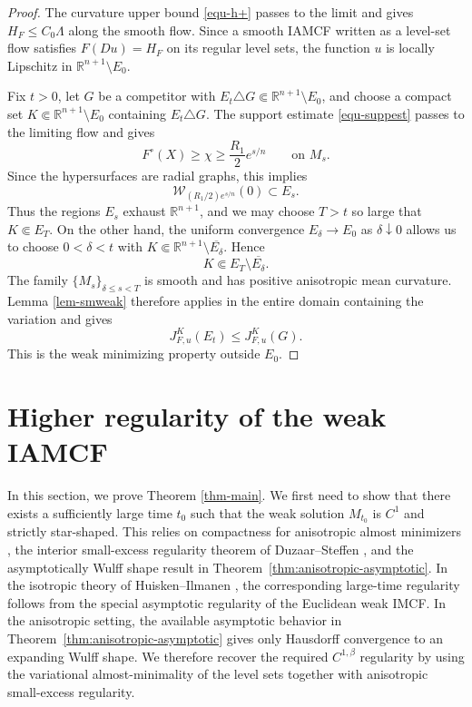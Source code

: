 \documentclass[10pt,a4paper]{amsart}
\numberwithin{equation}{section}
\begin{document}
\begin{proof}
	The curvature upper bound \eqref{equ-h+} passes to the limit and gives $H_F\leq C_0\Lambda$ along the smooth flow. Since a smooth IAMCF written as a level-set flow satisfies $F(Du)=H_F$ on its regular level sets, the function $u$ is locally Lipschitz in $\mathbb{R}^{n+1}\setminus E_0$.

	Fix $t>0$, let $G$ be a competitor with $E_t\triangle G\Subset\mathbb{R}^{n+1}\setminus E_0$, and choose a compact set $K\Subset\mathbb{R}^{n+1}\setminus E_0$ containing $E_t\triangle G$. The support estimate \eqref{equ-suppest} passes to the limiting flow and gives
	\begin{equation*}
		F^\circ(X)\geq\chi\geq \frac{R_1}{2}e^{s/n}
		\qquad\text{on }M_s.
	\end{equation*}
	Since the hypersurfaces are radial graphs, this implies
	\begin{equation*}
		\mathcal W_{(R_1/2)e^{s/n}}(0)\subset E_s.
	\end{equation*}
	Thus the regions $E_s$ exhaust $\mathbb R^{n+1}$, and we may choose $T>t$ so large that $K\Subset E_T$. On the other hand, the uniform convergence $E_\delta\to E_0$ as $\delta\downarrow0$ allows us to choose $0<\delta<t$ with $K\Subset\mathbb R^{n+1}\setminus\overline{E_\delta}$. Hence
	\begin{equation*}
		K\Subset E_T\setminus\overline{E_\delta}.
	\end{equation*}
	The family $\{M_s\}_{\delta\leq s<T}$ is smooth and has positive anisotropic mean curvature. Lemma \ref{lem-smweak} therefore applies in the entire domain containing the variation and gives
	\begin{equation*}
		J_{F,u}^K(E_t)\leq J_{F,u}^K(G).
	\end{equation*}
	This is the weak minimizing property outside $E_0$.
\end{proof}



	\section{Higher regularity of the weak IAMCF}
	\label{sec5}
	In this section, we prove Theorem \ref{thm-main}. We first need to show that there exists a sufficiently large time $t_0$ such that the weak solution $M_{t_0}$ is $C^1$ and strictly star-shaped. This relies on compactness for anisotropic almost minimizers \cite{DPM15}, the interior small-excess regularity theorem of Duzaar--Steffen \cite{DS02}, and the asymptotically Wulff shape result in Theorem~\ref{thm:anisotropic-asymptotic}. In the isotropic theory of Huisken--Ilmanen \cite{HI08}, the corresponding large-time regularity follows from the special asymptotic regularity of the Euclidean weak IMCF. In the anisotropic setting, the available asymptotic behavior in Theorem~\ref{thm:anisotropic-asymptotic} gives only Hausdorff convergence to an expanding Wulff shape. We therefore recover the required $C^{1,\beta}$ regularity by using the variational almost-minimality of the level sets together with anisotropic small-excess regularity.
\end{document}

